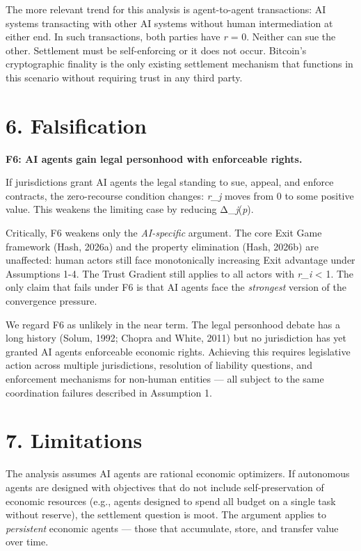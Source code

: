 \documentclass[12pt]{article}
\theoremstyle{definition}
\theoremstyle{remark}
\begin{document}
The more relevant trend for this analysis is agent-to-agent
transactions: AI systems transacting with other AI systems without human
intermediation at either end. In such transactions, both parties have
\emph{r} = 0. Neither can sue the other. Settlement must be
self-enforcing or it does not occur. Bitcoin's cryptographic finality is
the only existing settlement mechanism that functions in this scenario
without requiring trust in any third party.


\section{6. Falsification}\label{falsification}

\textbf{F6: AI agents gain legal personhood with enforceable rights.}

If jurisdictions grant AI agents the legal standing to sue, appeal, and
enforce contracts, the zero-recourse condition changes: \emph{r\_j}
moves from 0 to some positive value. This weakens the limiting case by
reducing Δ\_\emph{j}(\emph{p}).

Critically, F6 weakens only the \emph{AI-specific} argument. The core
Exit Game framework (Hash, 2026a) and the property elimination (Hash,
2026b) are unaffected: human actors still face monotonically increasing
Exit advantage under Assumptions 1-4. The Trust Gradient still applies
to all actors with \emph{r\_i} \textless{} 1. The only claim that fails
under F6 is that AI agents face the \emph{strongest} version of the
convergence pressure.

We regard F6 as unlikely in the near term. The legal personhood debate
has a long history (Solum, 1992; Chopra and White, 2011) but no
jurisdiction has yet granted AI agents enforceable economic rights.
Achieving this requires legislative action across multiple
jurisdictions, resolution of liability questions, and enforcement
mechanisms for non-human entities --- all subject to the same
coordination failures described in Assumption 1.


\section{7. Limitations}\label{limitations}

The analysis assumes AI agents are rational economic optimizers. If
autonomous agents are designed with objectives that do not include
self-preservation of economic resources (e.g., agents designed to spend
all budget on a single task without reserve), the settlement question is
moot. The argument applies to \emph{persistent} economic agents ---
those that accumulate, store, and transfer value over time.
\end{document}
